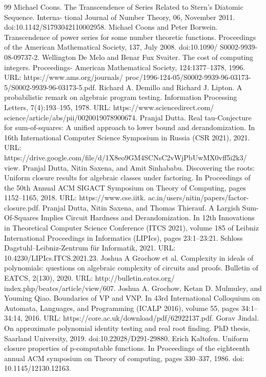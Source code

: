 \documentclass[10pt,a4paper]{article}
\begin{document}
\begin{thebibliography}{99}
 Michael Coons. The Transcendence of Series Related to Stern’s Diatomic Sequence. Interna- tional Journal of Number Theory, 06, November 2011. doi:10.1142/S1793042110002958.
 Michael Coons and Peter Borwein. Transcendence of power series for some number theoretic functions. Proceedings of the American Mathematical Society, 137, July 2008. doi:10.1090/ S0002-9939-08-09737-2.
 Wellington De Melo and Benar Fux Svaiter. The cost of computing integers. Proceedings- American Mathematical Society, 124:1377–1378, 1996. URL: https://www.ams.org/journals/ proc/1996-124-05/S0002-9939-96-03173-5/S0002-9939-96-03173-5.pdf.
 Richard A. Demillo and Richard J. Lipton. A probabilistic remark on algebraic program testing. Information Processing Letters, 7(4):193–195, 1978. URL: https://www.sciencedirect.com/ science/article/abs/pii/0020019078900674.
 Pranjal Dutta. Real tau-Conjecture for sum-of-squares: A unified approach to lower bound and derandomization. In 16th International Computer Science Symposium in Russia (CSR 2021), 2021. URL: https://drive.google.com/file/d/1X8eo9GM4SCNsC2vWjPbUwMX0vff5i2k3/ view.
 Pranjal Dutta, Nitin Saxena, and Amit Sinhababu. Discovering the roots: Uniform closure results for algebraic classes under factoring. In Proceedings of the 50th Annual ACM SIGACT Symposium on Theory of Computing, pages 1152–1165, 2018. URL: https://www.cse.iitk. ac.in/users/nitin/papers/factor-closure.pdf.
 Pranjal Dutta, Nitin Saxena, and Thomas Thierauf. A Largish Sum-Of-Squares Implies Circuit Hardness and Derandomization. In 12th Innovations in Theoretical Computer Science Conference (ITCS 2021), volume 185 of Leibniz International Proceedings in Informatics (LIPIcs), pages 23:1–23:21. Schloss Dagstuhl–Leibniz-Zentrum für Informatik, 2021. URL: 10.4230/LIPIcs.ITCS.2021.23.
 Joshua A Grochow et al. Complexity in ideals of polynomials: questions on algebraic complexity of circuits and proofs. Bulletin of EATCS, 2(130), 2020. URL: http://bulletin.eatcs.org/ index.php/beatcs/article/view/607.
 Joshua A. Grochow, Ketan D. Mulmuley, and Youming Qiao. Boundaries of VP and VNP. In 43rd International Colloquium on Automata, Languages, and Programming (ICALP 2016), volume 55, pages 34:1–34:14, 2016. URL: https://core.ac.uk/download/pdf/62922137.pdf.
 Gorav Jindal. On approximate polynomial identity testing and real root finding. PhD thesis, Saarland University, 2019. doi:10.22028/D291-29880.
 Erich Kaltofen. Uniform closure properties of p-computable functions. In Proceedings of the eighteenth annual ACM symposium on Theory of computing, pages 330–337, 1986. doi: 10.1145/12130.12163.

\end{thebibliography}
\end{document}
